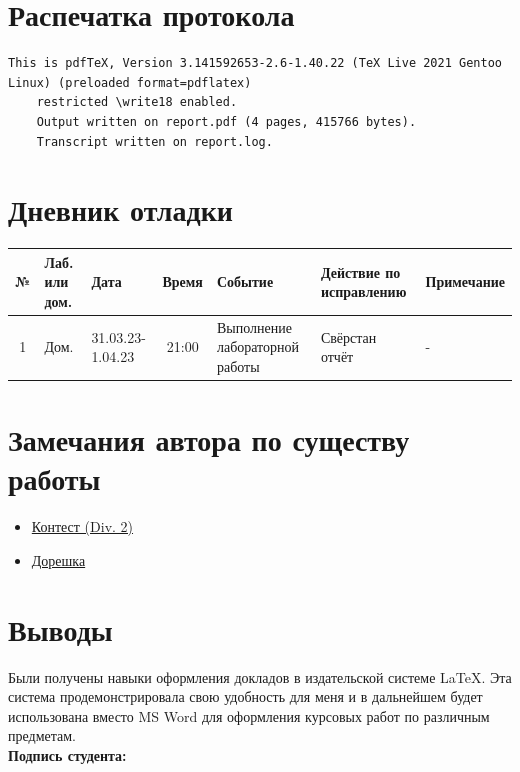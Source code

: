 \documentclass[12pt, letterpaper]{article}
\begin{document}
\section{Распечатка протокола}
\begin{lstlisting}[breaklines]
    This is pdfTeX, Version 3.141592653-2.6-1.40.22 (TeX Live 2021 Gentoo Linux) (preloaded format=pdflatex)
    restricted \write18 enabled.
    Output written on report.pdf (4 pages, 415766 bytes).
    Transcript written on report.log.
\end{lstlisting}  
\section{Дневник отладки}
\begin{tabular}{|c|p{1cm}|p{1.5cm}|c|p{2.5cm}|p{2cm}|p{2.25cm}|}
    \hline
    № & Лаб. или дом. & Дата & Время & Событие & Действие по исправлению & Примечание\\
    \hline
    1 & Дом. & 31.03.23-1.04.23 & 21:00 & Выполнение лабораторной работы & Свёрстан отчёт & -\\
    \hline
\end{tabular}
\section{Замечания автора по существу работы}
\begin{itemize}
\item \href{https://codeforces.com/contest/1809/submission/198774864}{Контест (Div. 2)}
\item \href{https://codeforces.com/contest/1809/submission/198997621}{Дорешка}
\end{itemize}
\section{Выводы}
Были получены навыки оформления докладов в издательской системе \LaTeX{}. Эта система продемонстрировала свою удобность для меня и в дальнейшем будет использована вместо MS Word для оформления курсовых работ по различным предметам. \\
\flushright \textbf{Подпись студента:} \underline{\hspace{3cm}}
\end{document}
